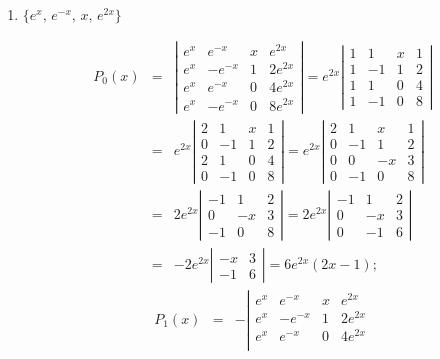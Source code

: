 \documentclass{ximera}
\begin{document}
\begin{problem}
\begin{enumerate}
 \item $\{e^x,\,e^{-x},\,x,\,e^{2x}\}$

\begin{solution}
\begin{eqnarray*}
P_0(x)&=&
\left|\begin{array}{crcc}
e^x&e^{-x}&x&e^{2x}\\
e^x&-e^{-x}&1&2e^{2x}\\
e^x&e^{-x}&0&4e^{2x}\\
e^x&-e^{-x}&0&8e^{2x}
\end{array}\right|=
e^{2x}\left|\begin{array}{crcc}
1&1&x&1\\
1&-1&1&2\\
1&1&0&4\\
1&-1&0&8
\end{array}\right|\\
&=&e^{2x}\left|\begin{array}{crcc}
2&1&x&1\\
0&-1&1&2\\
2&1&0&4\\
0&-1&0&8
\end{array}\right|=
e^{2x}\left|\begin{array}{crrc}
2&1&x&1\\
0&-1&1&2\\
0&0&-x&3\\
0&-1&0&8
\end{array}\right|\\
&=&2e^{2x}\left|\begin{array}{rrc}
-1&1&2\\
0&-x&3\\
-1&0&8
\end{array}\right|
=2e^{2x}\left|\begin{array}{rrc}
-1&1&2\\
0&-x&3\\
0&-1&6
\end{array}\right|\\
&=&-2e^{2x}\left|\begin{array}{rrc}
-x&3\\
-1&6
\end{array}\right|=6e^{2x}(2x-1);
\end{eqnarray*}
\begin{eqnarray*}
P_1(x)&=&
-\left|\begin{array}{crcc}
e^x&e^{-x}&x&e^{2x}\\
e^x&-e^{-x}&1&2e^{2x}\\
e^x&e^{-x}&0&4e^{2x}\\

\end{array}
\end{eqnarray*}
\end{solution}
\end{enumerate}
\end{problem}
\end{document}
